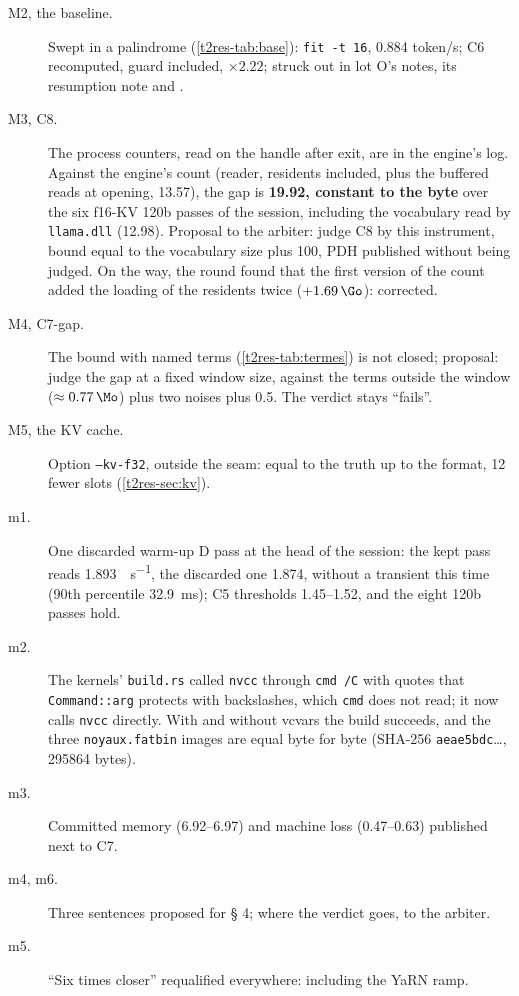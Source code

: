 \begin{description}
\item[M2, the baseline.] Swept in a palindrome (\cref{t2res-tab:base}): \texttt{fit -t 16}, \num{0.884} token/s; C6 recomputed, guard included, $\times 2.22$;  struck out in lot O's notes, its resumption note and .
\item[M3, C8.] The process counters, read on the handle after exit, are in the engine's log. Against the engine's count (reader, residents included, plus the buffered reads at opening, \SI{13.57}{\Mo}), the gap is \textbf{\SI{19.92}{\Mo}, constant to the byte} over the six f16-KV 120b passes of the session, including the vocabulary read by \texttt{llama.dll} (\SI{12.98}{\Mo}). Proposal to the arbiter: judge C8 by this instrument, bound equal to the vocabulary size plus \SI{100}{\Mo}, PDH published without being judged. On the way, the round found that the first version of the count added the loading of the residents twice ($+\SI{1.69}{\Go}$): corrected.
\item[M4, C7-gap.] The bound with named terms (\cref{t2res-tab:termes}) is not closed; proposal: judge the gap at a fixed window size, against the terms outside the window ($\approx \SI{0.77}{\Mo}$) plus two noises plus \SI{0.5}{\Mo}. The verdict stays ``fails''.
\item[M5, the KV cache.] Option \texttt{--kv-f32}, outside the seam: equal to the truth up to the format, 12 fewer slots (\cref{t2res-sec:kv}).
\item[m1.] One discarded warm-up D pass at the head of the session: the kept pass reads \SI{1.893}{\Go\per\second}, the discarded one \num{1.874}, without a transient this time (90th percentile \SI{32.9}{\milli\second}); C5 thresholds \numrange{1.45}{1.52}, and the eight 120b passes hold.
\item[m2.] The kernels' \texttt{build.rs} called \texttt{nvcc} through \texttt{cmd /C} with quotes that \texttt{Command::arg} protects with backslashes, which \texttt{cmd} does not read; it now calls \texttt{nvcc} directly. With and without vcvars the build succeeds, and the three \texttt{noyaux.fatbin} images are equal byte for byte (SHA-256 \texttt{aeae5bdc}…, \num{295864} bytes).
\item[m3.] Committed memory (\SIrange{6.92}{6.97}{\Go}) and machine loss (\SIrange{0.47}{0.63}{\Go}) published next to C7.
\item[m4, m6.] Three sentences proposed for § 4; where the verdict goes, to the arbiter.
\item[m5.] ``Six times closer'' requalified everywhere: including the YaRN ramp.
\end{description}

